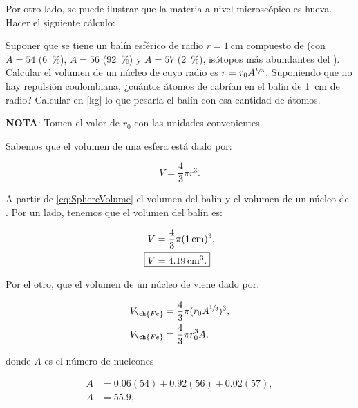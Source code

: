 \documentclass[./../main.tex]{subfiles}
\begin{document}
    \setcounter{exercise}{1}
    \begin{exercise}
        Por otro lado, se puede ilustrar que la materia a nivel microscópico es hueva. Hacer el siguiente cálculo:

        Suponer que se tiene un balín esférico de radio \(r = \SI{1}{\cm}\) compuesto de  (con \(A = 54\) (\SI{6}{\percent}), \(A = 56\) (\SI{92}{\percent}) y \(A = 57\) (\SI{2}{\percent}), isótopos más abundantes del ). Calcular el volumen de un núcleo de  cuyo radio es \(r = r_{0}A^{\sfrac{1}{3}}\). Suponiendo que no hay repulsión coulombiana, ¿cuántos átomos de  cabrían en el balín de \SI{1}{\cm} de radio? Calcular en [\unit{\kg}] lo que pesaría el balín con esa cantidad de átomos.

        \textbf{NOTA}: Tomen el valor de \(r_{0}\) con las unidades convenientes.

        \begin{solution}
            Sabemos que el volumen de una esfera está dado por:

            \begin{equation}
                V = \dfrac{4}{3}\pi r^{3}.
                \label{eq:SphereVolume}
            \end{equation}
            
            A partir de \cref{eq:SphereVolume} el volumen del balín y el volumen de un núcleo de . Por un lado, tenemos que el volumen del balín es:

            \begin{align}
                V &= \dfrac{4}{3}\pi(\SI{1}{\cm})^{3},\nonumber\\
                \Aboxed{V &= \SI{4.19}{\cm\cubed}.}
                \label{eq:PelletVolume}
            \end{align}

            Por el otro, que el volumen de un núcleo de  viene dado por:

            \begin{align}
                V_{\ch{Fe}} &= \dfrac{4}{3}\pi(r_{0}A^{\sfrac{1}{3}})^{3},\nonumber\\
                V_{\ch{Fe}} &= \dfrac{4}{3}\pi r_{0}^{3}A,\label{eq:FeNucleusVolume}
            \end{align}

            donde \(A\) es el número de nucleones

            \begin{align*}
                A &= 0.06(54) + 0.92(56) + 0.02(57),\\
                A &= 55.9,
            \end{align*}


\end{solution}
\end{exercise}
\end{document}
